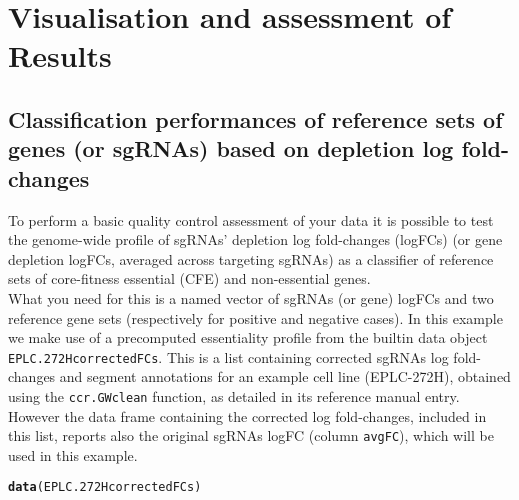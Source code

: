 \documentclass{article}\usepackage[]{graphicx}\usepackage[]{color}
\makeatletter
\newcommand{\hlstd}[1]{\textcolor[rgb]{0.345,0.345,0.345}{#1}}%
\newcommand{\hlkwd}[1]{\textcolor[rgb]{0.737,0.353,0.396}{\textbf{#1}}}%
\newenvironment{kframe}{%
 \def\at@end@of@kframe{}%
 \ifinner\ifhmode%
  \def\at@end@of@kframe{\end{minipage}}%
  \begin{minipage}{\columnwidth}%
 \fi\fi%
 \def\FrameCommand##1{\hskip\@totalleftmargin \hskip-\fboxsep
 \colorbox{shadecolor}{##1}\hskip-\fboxsep
     \hskip-\linewidth \hskip-\@totalleftmargin \hskip\columnwidth}%
 \MakeFramed {\advance\hsize-\width
   \@totalleftmargin\z@ \linewidth\hsize
   \@setminipage}}%
 {\par\unskip\endMakeFramed%
 \at@end@of@kframe}
\newenvironment{knitrout}{}{} %
\makeatother
\begin{document}
\section{Visualisation and assessment of Results}

\subsection{Classification performances of reference sets of genes (or sgRNAs) based on depletion log fold-changes}

To perform a basic quality control assessment of your data it is possible to test the genome-wide profile of sgRNAs' depletion log fold-changes (logFCs) (or gene depletion logFCs, averaged across targeting sgRNAs) as a classifier of reference sets of core-fitness essential (CFE) and non-essential genes.\\

What you need for this is a named vector of sgRNAs (or gene) logFCs and two reference gene sets (respectively for positive and negative cases). In this example we make use of a precomputed essentiality profile from the builtin data object \texttt{EPLC.272HcorrectedFCs}. This is a list containing corrected sgRNAs log fold-changes and segment annotations for an example cell line (EPLC-272H), obtained using the \texttt{ccr.GWclean} function, as detailed in its reference manual entry. However the data frame containing the corrected log fold-changes, included in this list, reports also the original sgRNAs logFC (column \texttt{avgFC}), which will be used in this example.

\begin{knitrout}
\color{fgcolor}\begin{kframe}
\begin{alltt}
\hlkwd{data}\hlstd{(EPLC.272HcorrectedFCs)}
\end{alltt}
\end{kframe}
\end{knitrout}
\end{document}
